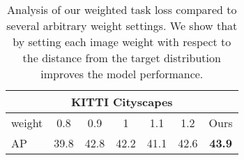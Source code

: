 \documentclass[10pt,twocolumn,letterpaper]{article}
\begin{document}
\begingroup
\renewcommand{\arraystretch}{0.75}
\begin{table}
\begin{center}
\caption{
Analysis of our weighted task loss compared to several arbitrary weight settings.
We show that by setting each image weight with respect to the distance from the target distribution improves the model performance.
}
\vspace{3mm}
\label{tab:weight}
\begin{tabular}{lcccccc}
				\toprule
                \multicolumn{7}{c}{KITTI  Cityscapes} \\
				\midrule
				weight & 0.8& 0.9& 1& 1.1& 1.2 & Ours\\
			   \midrule
			   AP & 39.8& 42.8& 42.2& 41.1& 42.6& \textbf{43.9}\\
			   \bottomrule
\end{tabular}
\vspace{-7mm}
\end{center}
\end{table}
\endgroup
\end{document}
